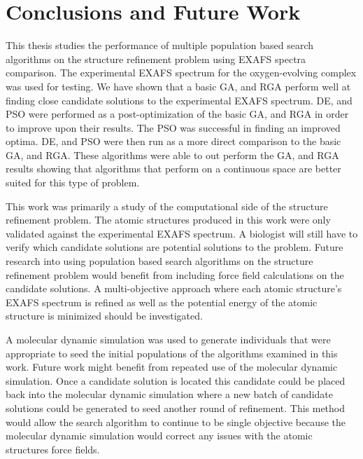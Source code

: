 \chapter{Conclusions and Future Work}

This thesis studies the performance of multiple population based search algorithms on the structure refinement problem using EXAFS spectra comparison. The experimental EXAFS spectrum for the oxygen-evolving complex was used for testing. We have shown that a basic GA, and RGA perform well at finding close candidate solutions to the experimental EXAFS spectrum. DE, and PSO were performed as a post-optimization of the basic GA, and RGA in order to improve upon their results. The PSO was successful in finding an improved optima. DE, and PSO were then run as a more direct comparison to the basic GA, and RGA. These algorithms were able to out perform the GA, and RGA results showing that algorithms that perform on a continuous space are better suited for this type of problem.

This work was primarily a study of the computational side of the structure refinement problem. The atomic structures produced in this work were only validated against the experimental EXAFS spectrum. A biologist will still have to verify which candidate solutions are potential solutions to the problem. Future research into using population based search algorithms on the structure refinement problem would benefit from including force field calculations on the candidate solutions. A multi-objective approach where each atomic structure's EXAFS spectrum is refined as well as the potential energy of the atomic structure is minimized should be investigated.

A molecular dynamic simulation was used to generate individuals that were appropriate to seed the initial populations of the algorithms examined in this work. Future work might benefit from repeated use of the molecular dynamic simulation. Once a candidate solution is located this candidate could be placed back into the molecular dynamic simulation where a new batch of candidate solutions could be generated to seed another round of refinement. This method would allow the search algorithm to continue to be single objective because the molecular dynamic simulation would correct any issues with the atomic structures force fields.